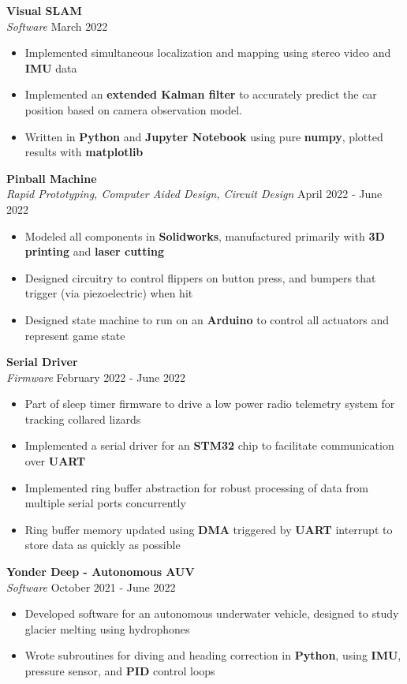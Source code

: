 \documentclass[a4paper]{article}
\newenvironment{entry}[4][]{
  \textbf{#2} \hfill #1 \\
  \textit{#3} \hfill #4 \\
  \vspace{-2mm}
  \begin{itemize} \itemsep 0em
  }
  {
  \end{itemize}
}
\begin{document}
\begin{entry}{Visual SLAM}{Software}{March 2022}
\item Implemented simultaneous localization and mapping using stereo video and \textbf{IMU} data
\item Implemented an \textbf{extended Kalman filter} to accurately predict the car position based on camera observation model.
\item Written in \textbf{Python} and \textbf{Jupyter Notebook} using pure \textbf{numpy}, plotted results with \textbf{matplotlib}
\end{entry}

\begin{entry}{Pinball Machine}{Rapid Prototyping, Computer Aided Design, Circuit
    Design}{April 2022 - June 2022}
\item Modeled all components in \textbf{Solidworks}, manufactured primarily with \textbf{3D printing} and \textbf{laser cutting}
\item Designed circuitry to control flippers on button press, and bumpers that
  trigger (via piezoelectric) when hit
\item Designed state machine to run on an \textbf{Arduino} to control all actuators and represent game state
\end{entry}

\begin{entry}{Serial Driver}{Firmware}{February 2022 - June 2022}
\item Part of sleep timer firmware to drive a low power radio telemetry system
  for tracking collared lizards
\item Implemented a serial driver for an \textbf{STM32} chip to facilitate
  communication over \textbf{UART}
\item Implemented ring buffer abstraction for robust processing of data from multiple serial ports concurrently
\item Ring buffer memory updated using \textbf{DMA} triggered by \textbf{UART}
  interrupt to store data as quickly as possible
\end{entry}

\begin{entry}{Yonder Deep - Autonomous AUV}{Software}{October 2021 - June 2022}
\item Developed software for an autonomous underwater vehicle, designed to study glacier melting using hydrophones
\item Wrote subroutines for diving and heading correction in \textbf{Python}, using \textbf{IMU}, pressure sensor, and \textbf{PID} control loops
\end{entry}
\end{document}
